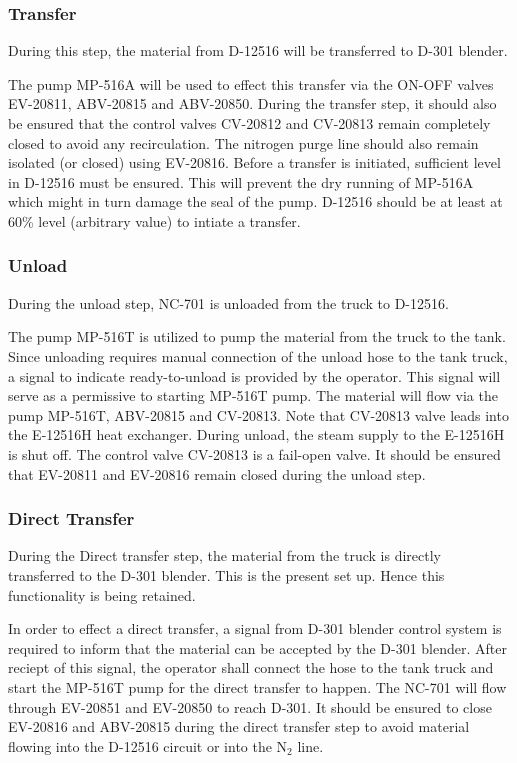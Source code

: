 \documentclass[a4paper,oneside]{article}
\begin{document}
\subsubsection{Transfer}
\label{sec:orga16f2fb}
During this step, the material from D-12516 will be transferred to
D-301 blender. 

The pump MP-516A will be used to effect this transfer via the ON-OFF
valves EV-20811, ABV-20815 and ABV-20850. During the transfer step, it
should also be ensured that the control valves CV-20812 and CV-20813
remain completely closed to avoid any recirculation. The nitrogen
purge line should also remain isolated (or closed) using EV-20816.
Before a transfer is initiated, sufficient level in D-12516 must be
ensured. This will prevent the dry running of MP-516A which might in
turn damage the seal of the pump. D-12516 should be at least at 60\%
level (arbitrary value) to intiate a transfer.
\subsubsection{Unload}
\label{sec:orgc378cc2}
During the unload step, NC-701 is unloaded from the truck to
D-12516. 

The pump MP-516T is utilized to pump the material from the truck to
the tank. Since unloading requires manual connection of the unload
hose to the tank truck, a signal to indicate ready-to-unload is
provided by the operator. This signal will serve as a permissive to
starting MP-516T pump. The material will flow via the pump MP-516T,
ABV-20815 and CV-20813. Note that CV-20813 valve leads into the
E-12516H heat exchanger. During unload, the steam supply to the
E-12516H is shut off. The control valve CV-20813 is a fail-open
valve. It should be ensured that EV-20811 and EV-20816 remain closed
during the unload step.
\subsubsection{Direct Transfer}
\label{sec:orgf8185fb}
During the Direct transfer step, the material from the truck is
directly transferred to the D-301 blender. This is the present set
up. Hence this functionality is being retained.

In order to effect a direct transfer, a signal from D-301 blender
control system is required to inform that the material can be accepted
by the D-301 blender. After reciept of this signal, the operator shall
connect the hose to the tank truck and start the MP-516T pump for the
direct transfer to happen. The NC-701 will flow through EV-20851 and
EV-20850 to reach D-301. It should be ensured to close EV-20816 and
ABV-20815 during the direct transfer step to avoid material flowing
into the D-12516 circuit or into the N\(_{\text{2}}\) line.
\end{document}
